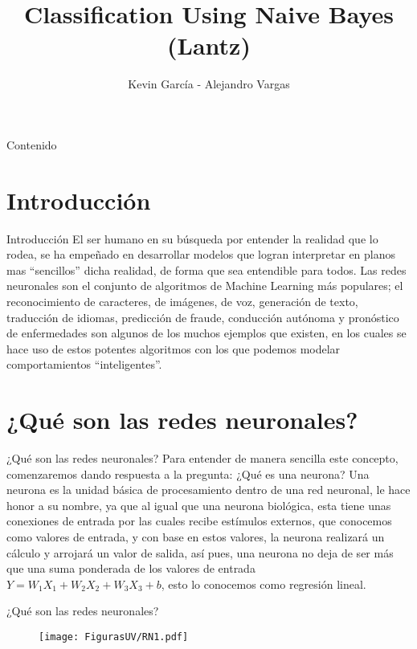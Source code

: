 \documentclass[10pt]{beamer}
\author{Kevin García - Alejandro Vargas}
\title{Classification Using Naive Bayes (Lantz)}
\begin{document}
\begin{frame}[plain]
\maketitle
\end{frame}

\begin{frame}{Contenido}
\tableofcontents
\end{frame}

\section{Introducción}
\begin{frame}{Introducción}
El ser humano en su búsqueda por entender la realidad que lo rodea, se ha empeñado en
desarrollar modelos que logran interpretar en planos mas ``sencillos'' dicha realidad, de forma que
sea entendible para todos. Las redes neuronales son el conjunto de algoritmos de Machine Learning
más populares; el reconocimiento de caracteres, de imágenes, de voz, generación de texto, traducción
de idiomas, predicción de fraude, conducción autónoma y pronóstico de enfermedades son algunos
de los muchos ejemplos que existen, en los cuales se hace uso de estos potentes algoritmos con los
que podemos modelar comportamientos ``inteligentes''.
\end{frame}


\section{¿Qué son las redes neuronales?}
\begin{frame}{¿Qué son las redes neuronales?}
Para entender de manera sencilla este concepto, comenzaremos dando respuesta a la pregunta: ¿Qué es una neurona? Una neurona es la unidad básica de procesamiento dentro de una red neuronal, le hace honor a su nombre, ya que al igual que una neurona biológica, esta tiene unas conexiones de entrada por las cuales recibe estímulos externos, que conocemos como valores de entrada, y con base en estos valores, la neurona realizará un cálculo y arrojará un valor de salida,
así pues, una neurona no deja de ser más que una suma ponderada de los valores de entrada $Y = W_1X_1 +W_2X_2 +W_3X_3 + b$, esto lo conocemos como regresión lineal.
\end{frame}

\begin{frame}{¿Qué son las redes neuronales?}
\begin{figure}[h!]
  \centering
  \texttt{[image: FigurasUV/RN1.pdf]}
\end{figure}
\end{frame}
\end{document}
